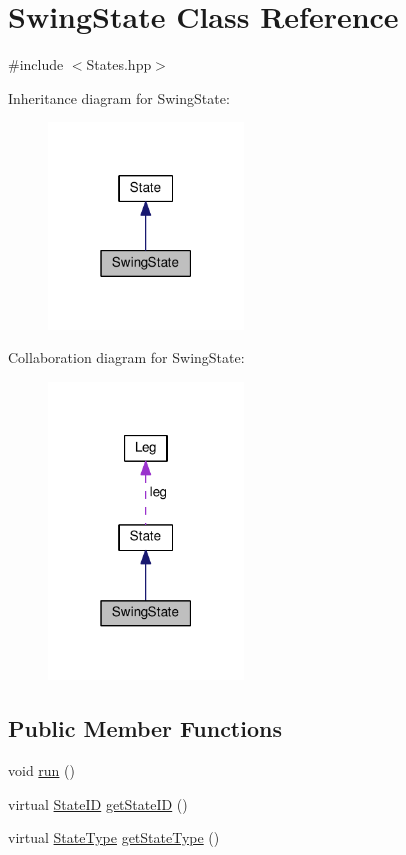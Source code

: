\hypertarget{classSwingState}{}\section{Swing\+State Class Reference}
\label{classSwingState}


{\ttfamily \#include $<$States.\+hpp$>$}



Inheritance diagram for Swing\+State\+:\nopagebreak
\begin{figure}[H]
\begin{center}
\leavevmode
\includegraphics[width=147pt]{classSwingState__inherit__graph}
\end{center}
\end{figure}


Collaboration diagram for Swing\+State\+:
\nopagebreak
\begin{figure}[H]
\begin{center}
\leavevmode
\includegraphics[width=147pt]{classSwingState__coll__graph}
\end{center}
\end{figure}
\subsection*{Public Member Functions}
\begin{DoxyCompactItemize}
\item 
void \hyperlink{classSwingState_ad5dc6a0a20bc1df5d69ea465679f4079}{run} ()
\item 
virtual \hyperlink{States_8hpp_a26aafbeccd8f356b39e1809f1ab9cfdc}{State\+ID} \hyperlink{classSwingState_a30a2ed580cb981e1091b11f693933883}{get\+State\+ID} ()
\item 
virtual \hyperlink{States_8hpp_a1615968a92950438f6e67a28e9d56e5c}{State\+Type} \hyperlink{classSwingState_ae97ab41925134675cfd2ba84744b7c50}{get\+State\+Type} ()
\end{DoxyCompactItemize}
